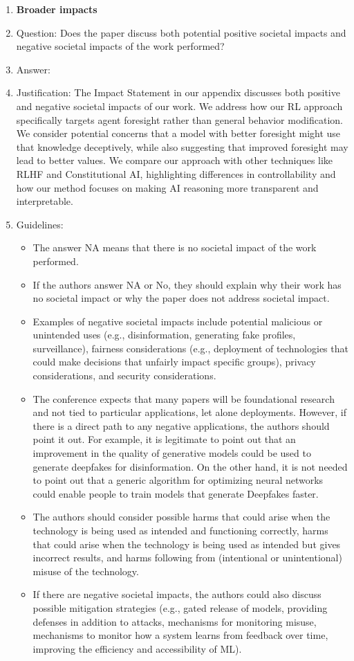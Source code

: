 \documentclass{article}
\begin{document}
\begin{enumerate}
\item {\bf Broader impacts}
    \item[] Question: Does the paper discuss both potential positive societal impacts and negative societal impacts of the work performed?
    \item[] Answer: \answerYes{} %
    \item[] Justification: The Impact Statement in our appendix discusses both positive and negative societal impacts of our work. We address how our RL approach specifically targets agent foresight rather than general behavior modification. We consider potential concerns that a model with better foresight might use that knowledge deceptively, while also suggesting that improved foresight may lead to better values. We compare our approach with other techniques like RLHF and Constitutional AI, highlighting differences in controllability and how our method focuses on making AI reasoning more transparent and interpretable. 
    \item[] Guidelines:
    \begin{itemize}
        \item The answer NA means that there is no societal impact of the work performed.
        \item If the authors answer NA or No, they should explain why their work has no societal impact or why the paper does not address societal impact.
        \item Examples of negative societal impacts include potential malicious or unintended uses (e.g., disinformation, generating fake profiles, surveillance), fairness considerations (e.g., deployment of technologies that could make decisions that unfairly impact specific groups), privacy considerations, and security considerations.
        \item The conference expects that many papers will be foundational research and not tied to particular applications, let alone deployments. However, if there is a direct path to any negative applications, the authors should point it out. For example, it is legitimate to point out that an improvement in the quality of generative models could be used to generate deepfakes for disinformation. On the other hand, it is not needed to point out that a generic algorithm for optimizing neural networks could enable people to train models that generate Deepfakes faster.
        \item The authors should consider possible harms that could arise when the technology is being used as intended and functioning correctly, harms that could arise when the technology is being used as intended but gives incorrect results, and harms following from (intentional or unintentional) misuse of the technology.
        \item If there are negative societal impacts, the authors could also discuss possible mitigation strategies (e.g., gated release of models, providing defenses in addition to attacks, mechanisms for monitoring misuse, mechanisms to monitor how a system learns from feedback over time, improving the efficiency and accessibility of ML).
    \end{itemize}
    

\end{enumerate}
\end{document}
